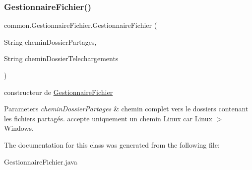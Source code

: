 \subsubsection{\texorpdfstring{Gestionnaire\+Fichier()}{GestionnaireFichier()}}
{\footnotesize\ttfamily common.\+Gestionnaire\+Fichier.\+Gestionnaire\+Fichier (\begin{DoxyParamCaption}\item[{String}]{chemin\+Dossier\+Partages,  }\item[{String}]{chemin\+Dossier\+Telechargements }\end{DoxyParamCaption})\hspace{0.3cm}{\ttfamily [inline]}}



constructeur de \hyperlink{classcommon_1_1GestionnaireFichier}{Gestionnaire\+Fichier} 


\begin{DoxyParams}{Parameters}
{\em chemin\+Dossier\+Partages} & chemin complet vers le dossiers contenant les fichiers partagés. accepte uniquement un chemin Linux car Linux $>$ Windows. \\
\hline
\end{DoxyParams}


The documentation for this class was generated from the following file\+:\begin{DoxyCompactItemize}
\item 
Gestionnaire\+Fichier.\+java\end{DoxyCompactItemize}
